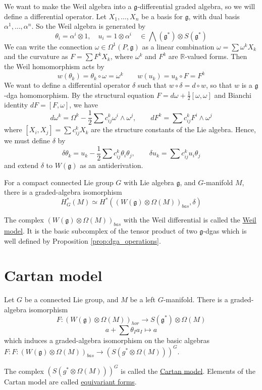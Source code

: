We want to make the Weil algebra into a $\mathfrak{g}$-differential graded
algebra, so we will define a differential operator. Let $X_1,\ldots,X_n$ be a basis
for $\mathfrak{g}$, with dual basis  $\alpha^1,\ldots,\alpha^n$. So the Weil
algebra is generated by 
\[
	 \theta_i = \alpha^i \otimes 1, \quad 
	 u_i = 1\otimes \alpha^i \quad\in \bigwedge(\mathfrak{g}^*)\otimes S(\mathfrak{g}^*)
\] 
We can write the connection $\omega\in\Omega^1(P,\mathfrak{g})$ as a linear
combination $\omega = \sum \omega^kX_k$ and the curvature as $F=\sum F^kX_k$,
where  $\omega^k$ and  $F^k$ are  $\mathbb{R}$-valued forms. 
Then the Weil homomorphism acts by 
\[
w(\theta_k) = \theta_k\circ \omega = \omega^k
\qquad 
w(u_k) = u_k\circ F = F^k
\] 
We want to define a differential operator $\delta$ such that  $w\circ \delta =
d\circ w$, so that $w$ is a  $\mathfrak{g}$-dga homomorphism. By the 
structural equation $F=d\omega + \frac{1}{2}[\omega,\omega]$ and 
Bianchi identity $dF=[F,\omega]$, we have
\[
d\omega^k = \Omega^k - \frac{1}{2}\sum c_{ij}^k \omega^i\wedge \omega^j,
\qquad 
dF^k = \sum c_{ij}^k F^i\wedge \omega^j
\] 
where $[X_i,X_j]=\sum c_{ij}^kX_k$ are the structure constants of the Lie
algebra. Hence, we must define $\delta$ by
\begin{equation}
\delta\theta_k = u_k - \frac{1}{2}\sum c_{ij}^k \theta_i\theta_j, \qquad
\delta u_k = \sum c_{ij}^k u_i\theta_j
\end{equation}
and extend $\delta$ to  $W(\mathfrak{g})$ as an antiderivation. 


\begin{thm} \label{thm:equivariant_de_Rham} %
	For a compact connected Lie group $G$ with Lie algebra $\mathfrak{g}$, and
	$G$-manifold  $M$, there is a graded-algebra isomorphism 
	 \[
		 H_G^*(M) \simeq H^*((W(\mathfrak{g})\otimes \Omega(M))_{bas}, \delta)
	\] 
\end{thm}
The complex $(W(\mathfrak{g})\otimes \Omega(M))_{bas}$ with the Weil
differential is called the \underline{Weil model}. It is the basic subcomplex of
the tensor product of two $\mathfrak{g}$-dgas which is well defined by
Proposition \ref{prop:dga_operations}.


\section{Cartan model}
\begin{thm} \label{thm:weil_cartan_iso} %
	Let $G$ be a connected Lie group, and $M$ be a left $G$-manifold. There is a
	graded-algebra isomorphism 
	\[
		F : (W(\mathfrak{g})\otimes \Omega(M))_{hor} \to S(\mathfrak{g}^*)\otimes \Omega(M)
	\] 
	\[
	a+ \sum \theta_I a_I \mapsto a
	\] 
	which induces a graded-algebra isomorphism on the basic algebras
	$F : F : (W(\mathfrak{g})\otimes \Omega(M))_{bas} \to (S(g^*\otimes
	\Omega(M)))^G$. 
\end{thm}
The complex $(S(g^*\otimes \Omega(M)))^G$ is called the \underline{Cartan
model}. Elements of the Cartan model are called \underline{equivariant forms}.

